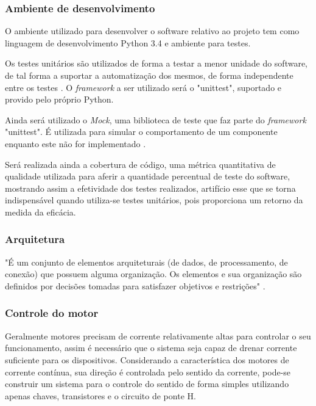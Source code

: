 \subsubsection{Ambiente de desenvolvimento}

O ambiente utilizado para desenvolver o software relativo ao projeto tem como linguagem de desenvolvimento Python 3.4 e ambiente para testes.

Os testes unitários são utilizados de forma a testar a menor unidade do software, de tal forma a suportar a automatização dos mesmos, de forma independente entre os testes \cite{unittest}. O \textit{framework} a ser utilizado será o "unittest", suportado e provido pelo próprio Python.

Ainda será utilizado o \textit{Mock}, uma biblioteca de teste que faz parte do \textit{framework} "unittest". É utilizada para simular o comportamento de um componente enquanto este não for implementado \cite{unittest_mock}.

Será realizada ainda a cobertura de código, uma métrica quantitativa de qualidade utilizada para aferir a quantidade percentual de teste do software, mostrando assim a efetividade dos testes realizados, artifício esse que se torna indispensável quando utiliza-se testes unitários, pois proporciona um retorno da medida da eficácia.

\subsubsection{Arquitetura}

"É um conjunto de elementos arquiteturais (de dados, de processamento, de conexão) que possuem alguma organização. Os elementos e sua organização são definidos por decisões tomadas para satisfazer objetivos e restrições" \cite{arquitetura_definition}.

\subsubsection{Controle do motor}

Geralmente motores precisam de corrente relativamente altas para controlar o seu funcionamento, assim é necessário que o sistema seja capaz de drenar corrente suficiente para os dispositivos. Considerando a característica dos motores de corrente contínua, sua direção é controlada pelo sentido da corrente, pode-se construir um sistema para o controle do sentido de forma simples utilizando apenas chaves, transistores e o circuito de ponte H.

